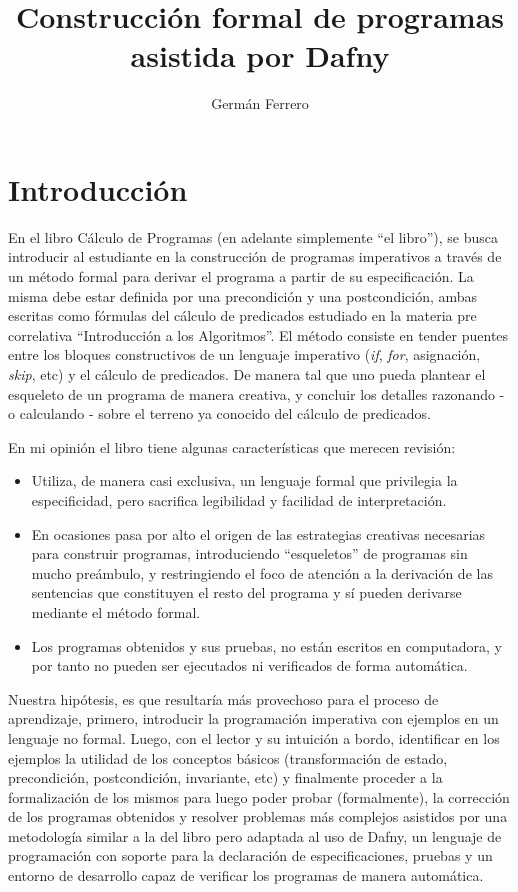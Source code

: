 \documentclass[12pt, a4paper, openany, fleqn]{book}
\author{Germán Ferrero}
\title{Construcción formal de programas asistida por Dafny}
\begin{document}
    \chapter{Introducción}
    En el libro Cálculo de Programas (en adelante simplemente ``el libro''), se busca introducir al estudiante en la construcción de programas imperativos a través de un método formal para derivar el programa a partir de su especificación. La misma debe estar definida por una precondición y una postcondición, ambas escritas como fórmulas del cálculo de predicados estudiado en la materia pre correlativa ``Introducción a los Algoritmos''. El método consiste en tender puentes entre los bloques constructivos de un lenguaje imperativo (\textit{if}, \textit{for}, asignación, \textit{skip}, etc) y el cálculo de predicados. De manera tal que uno pueda plantear el esqueleto de un programa de manera creativa, y concluir los detalles razonando - o calculando - sobre el terreno ya conocido del cálculo de predicados.

    En mi opinión el libro tiene algunas características que merecen revisión:
    \begin{itemize}
    \item Utiliza, de manera casi exclusiva, un lenguaje formal que privilegia la especificidad, pero sacrifica legibilidad y facilidad de interpretación.
    \item En ocasiones pasa por alto el origen de las estrategias creativas necesarias para construir programas, introduciendo ``esqueletos'' de programas sin mucho preámbulo, y restringiendo el foco de atención a la derivación de las sentencias que constituyen el resto del programa y sí pueden derivarse mediante el método formal.
    \item Los programas obtenidos y sus pruebas, no están escritos en computadora, y por tanto no pueden ser ejecutados ni verificados de forma automática.
    \end{itemize}

    Nuestra hipótesis, es que resultaría más provechoso para el proceso de aprendizaje, primero, introducir la programación imperativa con ejemplos en un lenguaje no formal. Luego, con el lector y su intuición a bordo, identificar en los ejemplos la utilidad de los conceptos básicos (transformación de estado, precondición, postcondición, invariante, etc) y finalmente proceder a la formalización de los mismos para luego poder probar (formalmente), la corrección de los programas obtenidos y resolver problemas más complejos asistidos por una metodología similar a la del libro pero adaptada al uso de Dafny, un lenguaje de programación con soporte para la declaración de especificaciones, pruebas y un entorno de desarrollo capaz de verificar los programas de manera automática.
\end{document}
